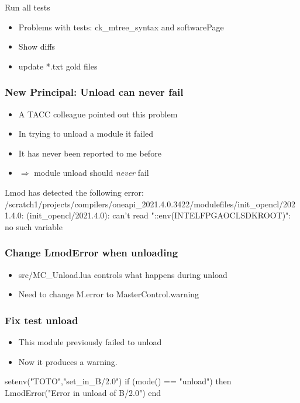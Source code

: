 \documentclass{beamer}
\begin{document}
\begin{frame}{Run all tests}
  \begin{itemize}
    \item Problems with tests: ck\_mtree\_syntax and softwarePage 
    \item Show diffs
    \item update *.txt gold files
  \end{itemize}
\end{frame}

\begin{frame}[fragile]
    \frametitle{New Principal: Unload can never fail}
  \begin{itemize}
    \item A TACC colleague pointed out this problem
    \item In trying to unload a module it failed
    \item It has never been reported to me before
    \item $\Rightarrow$ module unload should \emph{never} fail
  \end{itemize}
 {\tiny
    \begin{semiverbatim}
Lmod has detected the following error:
/scratch1/projects/compilers/oneapi\_2021.4.0.3422/modulefiles/init\_opencl/2021.4.0:
(init\_opencl/2021.4.0): can't read "::env(INTELFPGAOCLSDKROOT)": no such variable
    \end{semiverbatim}
}
\end{frame}

\begin{frame}[fragile]
    \frametitle{Change LmodError when unloading}
  \begin{itemize}
    \item src/MC_Unload.lua controls what happens during unload
    \item Need to change M.error to MasterControl.warning
  \end{itemize}
\end{frame}

\begin{frame}[fragile]
    \frametitle{Fix test unload}
  \begin{itemize}
    \item This module previously failed to unload
    \item Now it produces a warning.
  \end{itemize}

 {\small
    \begin{semiverbatim}
setenv("TOTO","set\_in\_B/2.0")
if (mode() == "unload") then
   LmodError("Error in unload of B/2.0")
end
    \end{semiverbatim}
}
\end{frame}
\end{document}
